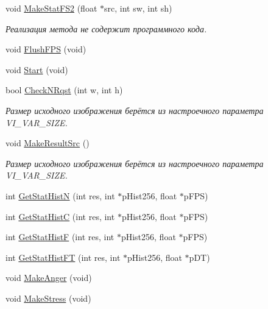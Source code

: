 \begin{DoxyCompactItemize}
void \hyperlink{class_c_v_i_engine_base_a4a2bee3b656476fdc3cb488a7019d7ae}{Make\+Stat\+F\+S2} (float $\ast$src, int sw, int sh)
\begin{DoxyCompactList}\small\item\em Реализация метода не содержит программного кода. \end{DoxyCompactList}\item 
void \hyperlink{class_c_v_i_engine_base_a7d2e5915b3c1c9f6172291305a99bfe5}{Flush\+F\+P\+S} (void)
\item 
void \hyperlink{class_c_v_i_engine_base_ab2c697a4748558b48789feca6a105042}{Start} (void)
\item 
bool \hyperlink{class_c_v_i_engine_base_a65b898d96c06c5c9bf9f388b4a70f740}{Check\+N\+Rqst} (int w, int h)
\begin{DoxyCompactList}\small\item\em Размер исходного изображения берётся из настроечного параметра V\+I\+\_\+\+V\+A\+R\+\_\+\+S\+I\+Z\+E. \end{DoxyCompactList}\item 
void \hyperlink{class_c_v_i_engine_base_ad231ab7aee4acfc00e9a55e778443ee4}{Make\+Result\+Src} ()
\begin{DoxyCompactList}\small\item\em Размер исходного изображения берётся из настроечного параметра V\+I\+\_\+\+V\+A\+R\+\_\+\+S\+I\+Z\+E. \end{DoxyCompactList}\item 
int \hyperlink{class_c_v_i_engine_base_a238c46a9344e280e609dcd974ce40a02}{Get\+Stat\+Hist\+N} (int res, int $\ast$p\+Hist256, float $\ast$p\+F\+P\+S)
\item 
int \hyperlink{class_c_v_i_engine_base_a8abf18dfc992c03f0dc9811be62ea5d5}{Get\+Stat\+Hist\+C} (int res, int $\ast$p\+Hist256, float $\ast$p\+F\+P\+S)
\item 
int \hyperlink{class_c_v_i_engine_base_a18bccff2c758d80e3d720953a0d949c1}{Get\+Stat\+Hist\+F} (int res, int $\ast$p\+Hist256, float $\ast$p\+F\+P\+S)
\item 
int \hyperlink{class_c_v_i_engine_base_ab631a7093c3f9e3e15b5a84e61358374}{Get\+Stat\+Hist\+F\+T} (int res, int $\ast$p\+Hist256, float $\ast$p\+D\+T)
\item 
void \hyperlink{class_c_v_i_engine_base_adf949a2b1abf18f519937d3f787c5abf}{Make\+Anger} (void)
\item 
void \hyperlink{class_c_v_i_engine_base_a746c67a403f60418bf26e1e686db0c0c}{Make\+Stress} (void)
\item 

\end{DoxyCompactItemize}
